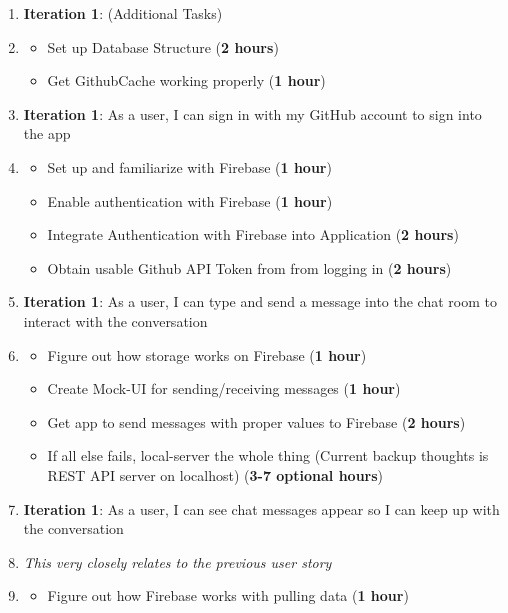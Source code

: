 \documentclass{report}
\begin{document}
\begin{enumerate}
    \item \textbf{Iteration 1}: (Additional Tasks)
    \item[] \begin{itemize}
        \item Set up Database Structure (\textbf{2 hours})
        \item Get GithubCache working properly (\textbf{1 hour})
    \end{itemize}
    \item \textbf{Iteration 1}: As a user, I can sign in with my GitHub account to sign into the app
    \item[] \begin{itemize}
        \item Set up and familiarize with Firebase (\textbf{1 hour})
        \item Enable authentication with Firebase (\textbf{1 hour})
        \item Integrate Authentication with Firebase into Application (\textbf{2 hours})
        \item Obtain usable Github API Token from from logging in (\textbf{2 hours})
    \end{itemize}
    \item \textbf{Iteration 1}: As a user, I can type and send a message into the chat room to interact with the conversation
    \item[] \begin{itemize}
        \item Figure out how storage works on Firebase (\textbf{1 hour})
        \item Create Mock-UI for sending/receiving  messages (\textbf{1 hour})
        \item Get app to send messages with proper values to Firebase (\textbf{2 hours})
        \item If all else fails, local-server the whole thing (Current backup thoughts is REST API server on localhost) (\textbf{3-7 optional hours})
    \end{itemize}
    \item \textbf{Iteration 1}: As a user, I can see chat messages appear so I can keep up with the conversation
    \item[] \textit{This very closely relates to the previous user story}
    \item[] \begin{itemize}
        \item Figure out how Firebase works with pulling data (\textbf{1 hour})

\end{itemize}
\end{enumerate}
\end{document}
